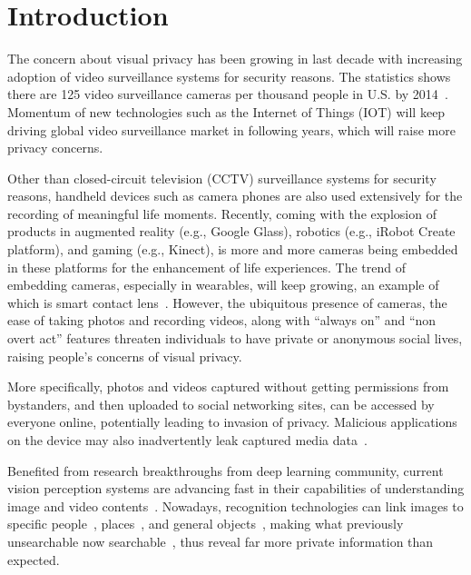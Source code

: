\chapter{Introduction}\label{sec-introduction}

The concern about visual privacy has been growing in last decade with increasing adoption of video surveillance systems for security reasons. The statistics shows there are 125 video surveillance cameras per thousand people in U.S. by 2014~\cite{links:numofsurv}. Momentum of new technologies such as the Internet of Things (IOT) will keep driving global video surveillance market in following years, which will raise more privacy concerns.

Other than closed-circuit television (CCTV) surveillance systems for security reasons, handheld devices such as camera phones are also used extensively for the recording of meaningful life moments. Recently, coming with the explosion of products in augmented reality (e.g., Google Glass), robotics (e.g., iRobot Create platform), and gaming (e.g., Kinect), is more and more cameras being embedded in these platforms for the enhancement of life experiences. The trend of embedding cameras, especially in wearables, will keep growing, an example of which is smart contact lens~\cite{links:eyecontact}. However, the ubiquitous presence of cameras, the ease of taking photos and recording videos, along with ``always on'' and ``non overt act'' features threaten individuals to have private or anonymous social lives, raising people's concerns of visual privacy.

More specifically, photos and videos captured without getting permissions from bystanders, and then uploaded to social networking sites, can be accessed by everyone online, potentially leading to invasion of privacy. Malicious applications on the device may also inadvertently leak captured media data~\cite{links:appleakspriv}.

Benefited from research breakthroughs from deep learning community, current vision perception systems are advancing fast in their capabilities of understanding image and video contents~\cite{links:awesomedeepvision}. Nowadays, recognition technologies can link images to specific people~\cite{taigman2014deepface,sun2015deepid3,schroff2015facenet}, places~\cite{weyand2016planet}, and general objects~\cite{russakovsky2015imagenet}, making what previously unsearchable now searchable~\cite{acquisti2014face}, thus reveal far more private information than expected.

